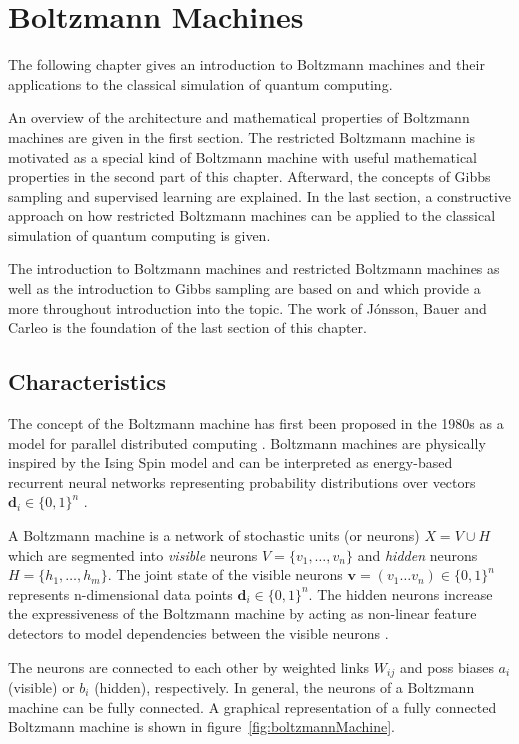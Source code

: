 \chapter{Boltzmann Machines}
\label{sec:rbm}
The following chapter gives an introduction to Boltzmann machines and their applications to the classical 
simulation of quantum computing.

An overview of the architecture and mathematical properties of Boltzmann machines are given in the first section. The restricted Boltzmann machine is motivated as a special kind of Boltzmann machine with useful mathematical properties in the second part of this chapter. Afterward, the concepts of Gibbs sampling and supervised learning are explained.
In the last section, a constructive approach on how restricted Boltzmann machines 
can be applied to the classical simulation of quantum computing is given.

The introduction to Boltzmann machines and restricted Boltzmann machines as well as the introduction 
to Gibbs sampling are based on \cite{montufar2018restricted} and 
\cite{fischer2012introduction} which provide a more throughout introduction 
into the topic. The work of J\'{o}nsson, Bauer and Carleo \cite{jnsson2018neuralnetwork} is the 
foundation of the last section of this chapter.

\section{Characteristics}
\label{sec:gbm}
The concept of the Boltzmann machine has first been proposed in the 1980s as a
model for parallel distributed computing \cite{hinton1983analyzing}. Boltzmann machines are physically inspired by the Ising Spin model and can be interpreted as energy-based recurrent neural networks representing probability distributions
over vectors $\bm{d}_i \in \{0,1\}^n$ \cite{ackley1985learning}.

A Boltzmann machine is a network of stochastic units (or neurons) $X=V \cup H$ which are segmented into
\textit{visible} neurons $V=\{v_1, \dots, v_n\}$ and \textit{hidden} neurons $H=\{h_1, \dots, h_m\}$.
The joint state of the visible neurons $\bm{v} = (v_1\dots v_n) \in \{0,1\}^n$ represents n-dimensional data
points $\bm{d}_i \in \{0,1\}^n$. The hidden neurons increase the expressiveness of the Boltzmann machine by acting as non-linear feature 
detectors to model dependencies between the visible neurons \cite{hinton2010boltzmann}.

The neurons are 
connected to each other by weighted links $W_{ij}$ and poss biases $a_i$ (visible) or $b_i$ (hidden), respectively. In 
general, the neurons of a Boltzmann machine can be fully connected. A graphical representation of a fully connected Boltzmann machine is shown in figure~\ref{fig:boltzmannMachine}.

